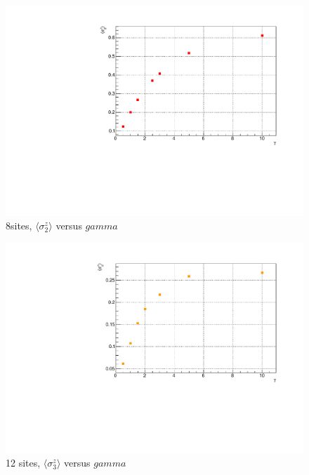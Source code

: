 \begin{figure}[H]
    \centering
    \includegraphics[scale=0.7]{Figures/8sites_comparison/8sites_LM_2ndSiteVSgamma.pdf}
    \caption{8sites, $\langle\sigma^z_2\rangle$ versus $gamma$}
    \label{fig:my_label}
\end{figure}

\begin{figure}[H]
    \centering
    \includegraphics[scale=0.7]{Figures/12sites/12sites_3rdSiteVSgamma.pdf}
    \caption{12 sites, $\langle\sigma^z_3\rangle$ versus $gamma$}
    \label{fig:my_label}
\end{figure}


